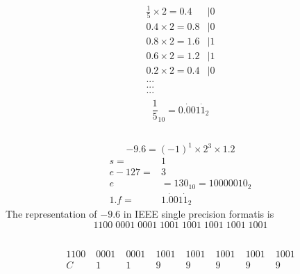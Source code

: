 \documentclass{article}
\begin{document}
    \section{}
        \subsection{}
            \begin{equation*}
                \begin{split}
                    \frac{1}{5}\times 2 =0.4 &| 0\\
                    0.4\times 2=0.8 &| 0\\
                    0.8\times 2 =1.6 &|1\\
                    0.6\times 2 = 1.2 &|1\\
                    0.2\times 2=0.4&|0\\
                    ...\\
                    ...\\
                    ...\\
                \end{split}
            \end{equation*}
            $$\frac{1}{5}_{10}=0.\dot{0}01\dot{1}_2$$
        \subsection{}
            $$-9.6=(-1)^1\times 2^3 \times 1.2$$
            \begin{equation*}
                \begin{split}
                    s=&1\\
                    e-127=&3\\
                        e&=130_{10}=10000010_2\\
                    1.f=&1.\dot{0}01\dot{1}_2
                \end{split}
            \end{equation*}
            The  representation  of $-9.6$ in IEEE single precision formatis is 
            $$1100\; 0001\; 0001\; 1001\; 1001\; 1001\; 1001\; 1001$$
        \subsection{}
            \begin{align*}
                1100 &\;0001 &\;0001&\;1001&\;1001&\;1001&\;1001&\;1001\\
                C&\;    1&\; 1&\; 9&\;  9&\; 9&\;  9&\;  9
            \end{align*}
\end{document}
